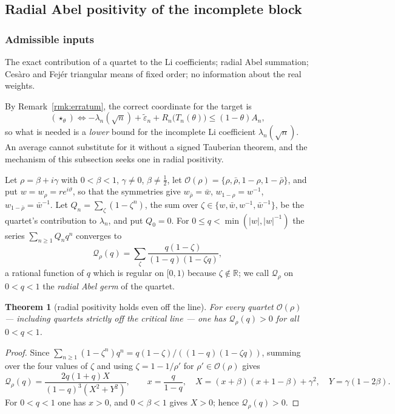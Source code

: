 \documentclass[11pt]{amsart}
\newtheorem{theorem}{Theorem}[section]
\theoremstyle{definition}
\theoremstyle{remark}
\theoremstyle{definition}
\newcommand{\half}{\tfrac{1}{2}}
\newcommand{\gam}{\gamma}
\newcommand{\eps}{\varepsilon}
\newcommand{\R}{\mathbb{R}}
\begin{document}
\subsection{Radial Abel positivity of the incomplete block}\label{sec:abel}

\subsubsection*{Admissible inputs}
The exact contribution of a quartet to the Li coefficients; radial Abel summation; Ces\`aro and
Fej\'er triangular means of fixed order; no information about the real weights.

By Remark~\ref{rmk:erratum}, the correct coordinate for the target is
\begin{equation}\label{eq:abel-coord}
   (\star_\theta)\iff
   -\lambda_n(\sqrt n)+\widetilde\eps_n+R_n\bigl(T_n(\theta)\bigr)\le(1-\theta)A_n ,
\end{equation}
so what is needed is a \emph{lower} bound for the incomplete Li coefficient
$\lambda_n(\sqrt n)$. An average cannot substitute for it without a signed Tauberian theorem, and
the mechanism of this subsection seeks one in radial positivity.

Let $\rho=\beta+i\gam$ with $0<\beta<1$, $\gam\ne0$, $\beta\ne\half$, let
$\mathcal O(\rho)=\{\rho,\bar\rho,1-\rho,1-\bar\rho\}$, and put $w=w_\rho=re^{i\vartheta}$, so
that the symmetries give $w_{\bar\rho}=\bar w$, $w_{1-\rho}=w^{-1}$,
$w_{1-\bar\rho}=\bar w^{-1}$. Let $Q_n=\sum_{\zeta}(1-\zeta^n)$, the sum over
$\zeta\in\{w,\bar w,w^{-1},\bar w^{-1}\}$, be the quartet's contribution to $\lambda_n$, and put
$Q_0=0$. For $0\le q<\min(|w|,|w|^{-1})$ the series $\sum_{n\ge1}Q_nq^n$ converges to
\[
   \mathcal Q_\rho(q)=\sum_\zeta\frac{q(1-\zeta)}{(1-q)(1-\zeta q)},
\]
a rational function of $q$ which is regular on $[0,1)$ because $\zeta\notin\R$; we call
$\mathcal Q_\rho$ on $0<q<1$ the \emph{radial Abel germ} of the quartet.

\begin{theorem}[radial positivity holds even off the line]\label{thm:abel}
For every quartet $\mathcal O(\rho)$ --- including quartets strictly off the critical line ---
one has $\mathcal Q_\rho(q)>0$ for all $0<q<1$.
\end{theorem}

\begin{proof}
Since $\sum_{n\ge1}(1-\zeta^n)q^n=q(1-\zeta)/((1-q)(1-\zeta q))$, summing over the four values of
$\zeta$ and using $\zeta=1-1/\rho'$ for $\rho'\in\mathcal O(\rho)$ gives
\[
   \mathcal Q_\rho(q)=\frac{2q(1+q)X}{(1-q)^3(X^2+Y^2)},\qquad x=\frac{q}{1-q},\quad
   X=(x+\beta)(x+1-\beta)+\gam^2,\quad Y=\gam(1-2\beta).
\]
For $0<q<1$ one has $x>0$, and $0<\beta<1$ gives $X>0$; hence $\mathcal Q_\rho(q)>0$.
\end{proof}
\end{document}
